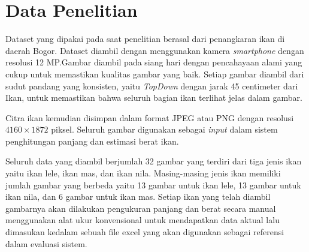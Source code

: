 


\section{Data Penelitian}
    Dataset yang dipakai pada saat penelitian berasal dari penangkaran ikan di daerah Bogor. Dataset diambil dengan menggunakan kamera \emph{smartphone} dengan resolusi 12 MP.\@ Gambar diambil pada siang hari dengan pencahayaan alami yang cukup untuk memastikan kualitas gambar yang baik.
Setiap gambar diambil dari sudut pandang yang konsisten, yaitu \emph{TopDown} dengan jarak 45 centimeter dari Ikan, untuk memastikan bahwa seluruh bagian ikan terlihat jelas dalam gambar. 

Citra ikan kemudian disimpan dalam format JPEG atau PNG dengan resolusi \(4160 \times 1872\) piksel. Seluruh gambar digunakan sebagai \emph{input} dalam sistem penghitungan panjang dan estimasi berat ikan.

Seluruh data yang diambil berjumlah 32 gambar yang terdiri dari tiga jenis ikan yaitu ikan lele, ikan mas, dan ikan nila. Masing-masing jenis ikan memiliki jumlah gambar yang berbeda yaitu 13 gambar untuk ikan lele, 13 gambar untuk ikan nila, dan 6 gambar untuk ikan mas.
Setiap ikan yang telah diambil gambarnya akan dilakukan pengukuran panjang dan berat secara manual menggunakan alat ukur konvensional untuk mendapatkan data aktual lalu dimasukan kedalam sebuah file excel yang akan digunakan sebagai referensi dalam evaluasi sistem. 

